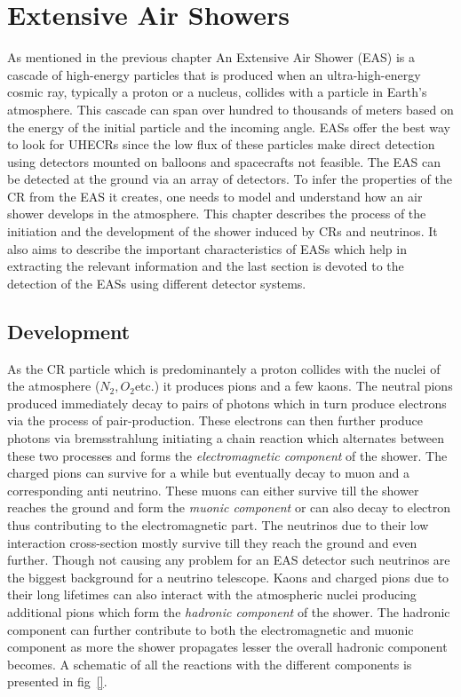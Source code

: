 
\chapter{Extensive Air Showers}
\label{chap:EAS}

As mentioned in the previous chapter An Extensive Air Shower (EAS) is a cascade of high-energy particles that is produced when an ultra-high-energy cosmic ray, typically a proton or a nucleus, collides with a particle in Earth's atmosphere. This cascade can span over hundred to thousands of meters based on the energy of the initial particle and the incoming angle. EASs offer the best way to look for UHECRs since the low flux of these particles make direct detection using detectors mounted on balloons and spacecrafts not feasible. The EAS can be detected at the ground via an array of detectors. To infer the properties of the CR from the EAS it creates, one needs to model and understand how an air shower develops in the atmosphere. This chapter describes the process of the initiation and the development of the shower induced by CRs and neutrinos. It also aims to describe the important characteristics of EASs which help in extracting the relevant information and the last section is devoted to the detection of the EASs using different detector systems. 

\section{Development}
\label{sec:EAS_dev}
As the CR particle which is predominantely a proton collides with the nuclei of the atmosphere ($N_2, O_2 $etc.) it produces pions and a few kaons. The neutral pions produced immediately decay to pairs of photons which in turn produce electrons via the process of pair-production. These electrons can then further produce photons via bremsstrahlung initiating a chain reaction which alternates between these two processes and forms the \textit{electromagnetic component} of the shower. The charged pions can survive for a while but eventually decay to muon and a corresponding anti neutrino. These muons can either survive till the shower reaches the ground and form the \textit{muonic component} or can also decay to electron thus contributing to the electromagnetic part. The neutrinos due to their low interaction cross-section mostly survive till they reach the ground and even further. Though not causing any problem for an EAS detector such neutrinos are the biggest background for a neutrino telescope. Kaons and charged pions due to their long lifetimes can also interact with the atmospheric nuclei producing additional pions which form the \textit{hadronic component} of the shower. The hadronic component can further contribute to both the electromagnetic and muonic component as more the shower propagates lesser the overall hadronic component becomes. A schematic of all the reactions with the different components is presented in fig~\ref{}.

